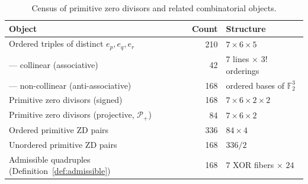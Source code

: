 \begin{table}[h]
\centering
\begin{tabular}{lrl}
\hline
\textbf{Object} & \textbf{Count} & \textbf{Structure} \\
\hline
Ordered triples of distinct $e_p,e_q,e_r$ & 210 & $7\times 6\times 5$ \\
\quad--- collinear (associative) & 42 & $7$ lines $\times$ $3!$ orderings \\
\quad--- non-collinear (anti-associative) & 168 & ordered bases of $\mathbb{F}_2^3$ \\
\hline
Primitive zero divisors (signed) & 168 & $7\times 6\times 2 \times 2$ \\
Primitive zero divisors (projective, $\mathscr{P}_+$) & 84 & $7\times 6\times 2$ \\
\hline
Ordered primitive ZD pairs & 336 & $84\times 4$ \\
Unordered primitive ZD pairs & 168 & $336/2$ \\
Admissible quadruples (Definition~\ref{def:admissible}) & 168 & $7$ XOR fibers $\times$ $24$ \\
\hline
\end{tabular}
\caption{Census of primitive zero divisors and related combinatorial objects.}
\label{tab:census}
\end{table}
